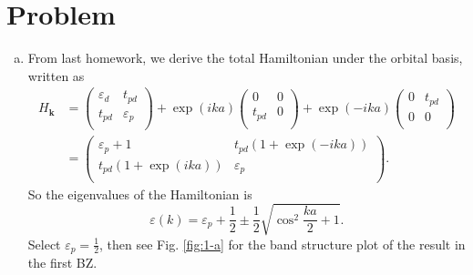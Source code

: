\documentclass[12pt]{article}
\newcommand*{\RMN}[1]{\uppercase\expandafter{\romannumeral#1}}
\begin{document}
\section{Problem \RMN{1}}
\begin{enumerate}[(a)]
    \item  From last homework, we derive the total Hamiltonian under the orbital
          basis, written as
          \begin{equation}
              \begin{split}
                  H_{\bm{k}}
                   & = \begin{pmatrix}
                           \varepsilon_d & t_{pd}        \\
                           t_{pd}        & \varepsilon_p \\
                       \end{pmatrix} + \exp(ika)
                  \begin{pmatrix}
                      0      & 0 \\
                      t_{pd} & 0 \\
                  \end{pmatrix} +
                  \exp(-ika)
                  \begin{pmatrix}
                      0 & t_{pd} \\
                      0 & 0      \\
                  \end{pmatrix}                                  \\
                   & = \begin{pmatrix}
                           \varepsilon_p + 1   & t_{pd}(1+\exp(-ika)) \\
                           t_{pd}(1+\exp(ika)) & \varepsilon_p        \\
                       \end{pmatrix}.
              \end{split}
          \end{equation}
          So the eigenvalues of the Hamiltonian is
          \begin{equation}\label{eq:1d}
              \varepsilon(k)=\varepsilon_p + \frac{1}{2} \pm \frac{1}{2}\sqrt{\cos^2\frac{k a}{2}+1}.
          \end{equation}
          Select $\varepsilon_p = \frac{1}{2}$, then
          see Fig. \ref{fig:1-a} for the band structure plot of the result in the first BZ.
          \begin{figure}[h]

\end{figure}
\end{enumerate}
\end{document}
